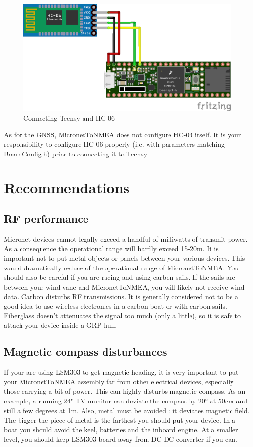 \documentclass{report}
\begin{document}
\begin{figure}[h]
	\centering
	\includegraphics{MicronetToNMEA_HC06.png}
	\caption{Connecting Teensy and HC-06}
	\label{figure:hc06}
\end{figure}

As for the GNSS, MicronetToNMEA does not configure HC-06 itself. It is your responsibility to configure HC-06 properly (i.e. with parameters matching BoardConfig.h) prior to connecting it to Teensy.

\section{Recommendations}

\subsection{RF performance}
Micronet devices cannot legally exceed a handful of milliwatts of transmit power. As a consequence the operational range will hardly exceed 15-20m. It is important not to put metal objects or panels between your various devices. This would dramatically reduce of the operational range of MicronetToNMEA.
You should also be careful if you are racing and using carbon sails. If the sails are between your wind vane and MicronetToNMEA, you will likely not receive wind data. Carbon disturbs RF transmissions.
It is generally considered not to be a good idea to use wireless electronics in a carbon boat or with carbon sails. Fiberglass doesn't attenuates the signal too much (only a little), so it is safe to attach your device inside a GRP hull.

\subsection{Magnetic compass disturbances}
\label{compass-recommendations}
If your are using LSM303 to get magnetic heading, it is very important to put your MicronetToNMEA assembly far from other electrical devices, especially those carrying a bit of power. This can highly disturbs magnetic compass. As an example, a running 24" TV monitor can deviate the compass by 20° at 50cm and still a few degrees at 1m.
Also, metal must be avoided : it deviates magnetic field. The bigger the piece of metal is the farthest you should put your device. In a boat you should avoid the keel, batteries and the inboard engine. At a smaller level, you should keep LSM303 board away from DC-DC converter if you can.
\end{document}
